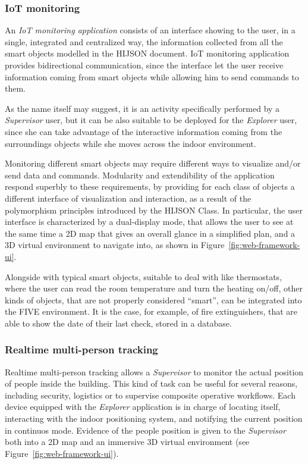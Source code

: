 \subsubsection{IoT monitoring}\label{iot-monitoring}

An \emph{IoT monitoring application} consists of an interface showing to the
user, in a single, integrated and centralized way, the information collected
from all the smart objects modelled in the HIJSON document. IoT monitoring
application provides bidirectional communication, since the interface let the
user receive information coming from smart objects while allowing him to send
commands to them.

As the name itself may suggest, it is an activity specifically performed by a
\emph{Supervisor} user, but it can be also suitable to be deployed for the
\emph{Explorer} user, since she can take advantage of the interactive
information coming from the surroundings objects while she moves across the
indoor environment.

Monitoring different smart objects may require different ways to visualize
and/or send data and commands. Modularity and extendibility of the application
respond superbly to these requirements, by providing for each class of objects
a different interface of visualization and interaction, as a result of the
polymorphism principles introduced by the HIJSON Class. In particular, the
user interface is characterized by a dual-display mode, that allows the user
to see at the same time a 2D map that gives an overall glance in a simplified
plan, and a 3D virtual environment to navigate into, as shown in
Figure~\ref{fig:web-framework-ui}.

Alongside with typical smart objects, suitable to deal with like thermostats,
where the user can read the room  temperature and turn the heating on/off,
other kinds of objects, that are not properly considered ``smart'', can be
integrated into the FIVE environment. It is the case, for example, of fire
extinguishers, that are able to show the date of their last check, stored in a
database.

\subsubsection{Realtime multi-person tracking}\label{realtime-multi-person-tracking}

Realtime multi-person tracking allows a \emph{Supervisor} to monitor the
actual position of people inside the building. This kind of task can be useful
for several reasons, including security, logistics or to supervise composite
operative workflows. Each device equipped with the \emph{Explorer} application
is in charge of locating itself, interacting with the indoor positioning
system, and notifying the current position in continuos mode. Evidence of the
people position is given to the \emph{Supervisor} both into a 2D map and an
immersive 3D virtual environment (see Figure~\ref{fig:web-framework-ui}).

